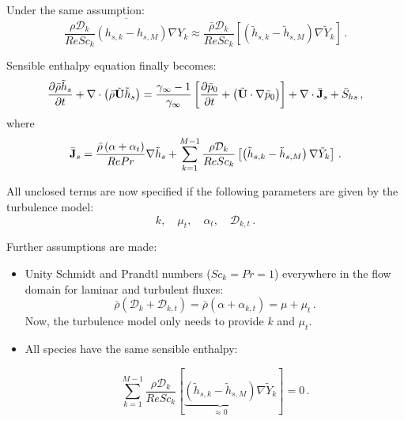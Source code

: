 Under the same assumption:
\begin{equation}
 \overline{\frac{\rho \mathcal{D}_k}{Re Sc_k}\left( h_{s,k} - h_{s,M} \right)
\nabla Y_k} \approx \frac{\bar{\rho} \mathcal{D}_k}{Re Sc_k} \left[ \left( \tilde{h}_{s,k} -
\tilde{h}_{s,M }\right) \nabla \tilde{Y}_k \right] \, .
\end{equation}

Sensible enthalpy equation finally becomes:
\begin{equation}\label{av: enthalpy}
\frac{\partial \bar{\rho} \tilde{h}_{s}}{\partial t} + \nabla \cdot
\left(\bar{\rho} \tilde{\bv{U}} \tilde{h}_{s} \right) = \frac{\gamma_{\infty} -1}{\gamma_{\infty}}
\left[ \frac{\partial \bar{p}_0}{\partial t} + \left( \tilde{\bv{U}} \cdot \nabla
\bar{p}_0 \right) \right]  + \nabla \cdot \bar{\bv{J}}_s + \bar{S}_{hs}\, ,
\end{equation} where 
\begin{equation}
\bar{\mathbf{J}}_s =  \frac{\bar{\rho} \left( \alpha + \alpha_t \right)}{Re Pr}
\nabla \tilde{h}_s + \sum_{k=1}^{M-1} \frac{\rho \mathcal{D}_k}{Re Sc_k} \left[
\left( \tilde{h}_{s,k} - \tilde{h}_{s,M }\right) \nabla \tilde{Y}_k \right] \, .
\end{equation}

All unclosed terms are now specified if the following parameters are given by
the turbulence model:
\begin{equation*}
 k, \quad \mu_t , \quad \alpha_t , \quad \mathcal{D}_{k,t} \, .
\end{equation*}

Further assumptions are made: 

\begin{itemize}
 \item Unity Schmidt and Prandtl numbers ($Sc_k = Pr = 1$) everywhere in the
flow domain for laminar and turbulent fluxes:
\begin{equation}\label{eq: sc1}
 \bar{\rho} \left(\mathcal{D}_k +\mathcal{D}_{k,t} \right) = \bar{\rho} \left(\alpha +\alpha_{k,t} \right) = \mu+\mu_t \, .
\end{equation} 
Now, the turbulence model only needs to provide $k$ and $\mu_t$.

 \item All species have the same sensible enthalpy:

\begin{equation}
 \sum_{k=1}^{M-1} \frac{\rho \mathcal{D}_k}{Re Sc_k} \left[ \underbrace{\left(
\tilde{h}_{s,k} - \tilde{h}_{s,M }\right)}_{\approx 0} \nabla \tilde{Y}_k
\right] =  0 \, .
\end{equation}

\end{itemize}

